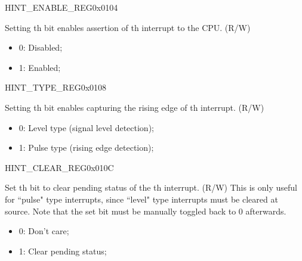 
\begin{register}{H}{INT\_ENABLE\_REG}{0x0104}\label{regdesc:INTENABLEREG}
%
%
\regnewline%
\begin{regdesc}
\begin{reglist}
\item [INT\_ENABLE\lbrack\regindex{n}\rbrack] Setting th bit enables assertion of th interrupt to the CPU. (R/W)
\begin{itemize}
    \setlength\itemsep{-1em}
    \item 0: Disabled;
    \item 1: Enabled;
\end{itemize}
\end{reglist}
\end{regdesc}
\end{register}

\begin{register}{H}{INT\_TYPE\_REG}{0x0108}\label{regdesc:INTTYPEREG}
%
%
\regnewline%
\begin{regdesc}
\begin{reglist}
\item [INT\_TYPE\lbrack\regindex{n}\rbrack] Setting th bit enables capturing the rising edge of th interrupt. (R/W)
\begin{itemize}
    \setlength\itemsep{-1em}
    \item 0: Level type (signal level detection);
    \item 1: Pulse type (rising edge detection);
\end{itemize}
\end{reglist}
\end{regdesc}
\end{register}

\begin{register}{H}{INT\_CLEAR\_REG}{0x010C}\label{regdesc:INTCLEARREG}
%
%
\regnewline%
\begin{regdesc}
\begin{reglist}
\item [INT\_CLEAR\lbrack\regindex{n}\rbrack] Set th bit to clear pending status of the th interrupt. (R/W) \newline This is only useful for ``pulse" type interrupts, since ``level" type interrupts must be cleared at source. \newline Note that the set bit must be manually toggled back to 0 afterwards.
\begin{itemize}
    \setlength\itemsep{-1em}
    \item 0: Don't care;
    \item 1: Clear pending status;
\end{itemize}
\end{reglist}
\end{regdesc}
\end{register}

